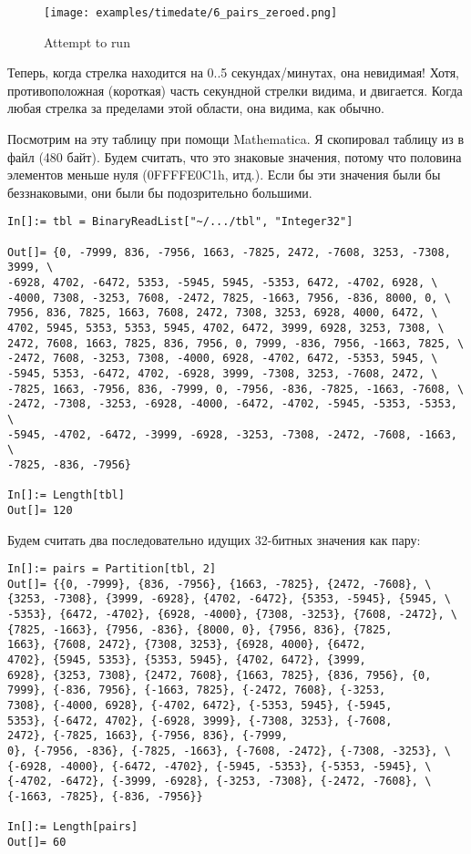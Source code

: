 \begin{figure}[H]
\centering
\texttt{[image: examples/timedate/6\_pairs\_zeroed.png]}
\caption{Attempt to run}
\end{figure}

Теперь, когда стрелка находится на 0..5 секундах/минутах, она невидимая! Хотя, противоположная (короткая) часть секундной
стрелки видима, и двигается.
Когда любая стрелка за пределами этой области, она видима, как обычно.

Посмотрим на эту таблицу при помощи Mathematica.
Я скопировал таблицу из  в файл  (480 байт).
Будем считать, что это знаковые значения, потому что половина элементов меньше нуля (0FFFFE0C1h, итд.).
Если бы эти значения были бы беззнаковыми, они были бы подозрительно большими.

\begin{lstlisting}[style=custommath]
In[]:= tbl = BinaryReadList["~/.../tbl", "Integer32"]

Out[]= {0, -7999, 836, -7956, 1663, -7825, 2472, -7608, 3253, -7308, 3999, \
-6928, 4702, -6472, 5353, -5945, 5945, -5353, 6472, -4702, 6928, \
-4000, 7308, -3253, 7608, -2472, 7825, -1663, 7956, -836, 8000, 0, \
7956, 836, 7825, 1663, 7608, 2472, 7308, 3253, 6928, 4000, 6472, \
4702, 5945, 5353, 5353, 5945, 4702, 6472, 3999, 6928, 3253, 7308, \
2472, 7608, 1663, 7825, 836, 7956, 0, 7999, -836, 7956, -1663, 7825, \
-2472, 7608, -3253, 7308, -4000, 6928, -4702, 6472, -5353, 5945, \
-5945, 5353, -6472, 4702, -6928, 3999, -7308, 3253, -7608, 2472, \
-7825, 1663, -7956, 836, -7999, 0, -7956, -836, -7825, -1663, -7608, \
-2472, -7308, -3253, -6928, -4000, -6472, -4702, -5945, -5353, -5353, \
-5945, -4702, -6472, -3999, -6928, -3253, -7308, -2472, -7608, -1663, \
-7825, -836, -7956}

In[]:= Length[tbl]
Out[]= 120
\end{lstlisting}

Будем считать два последовательно идущих 32-битных значения как пару:

\begin{lstlisting}[style=custommath]
In[]:= pairs = Partition[tbl, 2]
Out[]= {{0, -7999}, {836, -7956}, {1663, -7825}, {2472, -7608}, \
{3253, -7308}, {3999, -6928}, {4702, -6472}, {5353, -5945}, {5945, \
-5353}, {6472, -4702}, {6928, -4000}, {7308, -3253}, {7608, -2472}, \
{7825, -1663}, {7956, -836}, {8000, 0}, {7956, 836}, {7825, 
1663}, {7608, 2472}, {7308, 3253}, {6928, 4000}, {6472, 
4702}, {5945, 5353}, {5353, 5945}, {4702, 6472}, {3999, 
6928}, {3253, 7308}, {2472, 7608}, {1663, 7825}, {836, 7956}, {0, 
7999}, {-836, 7956}, {-1663, 7825}, {-2472, 7608}, {-3253, 
7308}, {-4000, 6928}, {-4702, 6472}, {-5353, 5945}, {-5945, 
5353}, {-6472, 4702}, {-6928, 3999}, {-7308, 3253}, {-7608, 
2472}, {-7825, 1663}, {-7956, 836}, {-7999, 
0}, {-7956, -836}, {-7825, -1663}, {-7608, -2472}, {-7308, -3253}, \
{-6928, -4000}, {-6472, -4702}, {-5945, -5353}, {-5353, -5945}, \
{-4702, -6472}, {-3999, -6928}, {-3253, -7308}, {-2472, -7608}, \
{-1663, -7825}, {-836, -7956}}

In[]:= Length[pairs]
Out[]= 60
\end{lstlisting}

